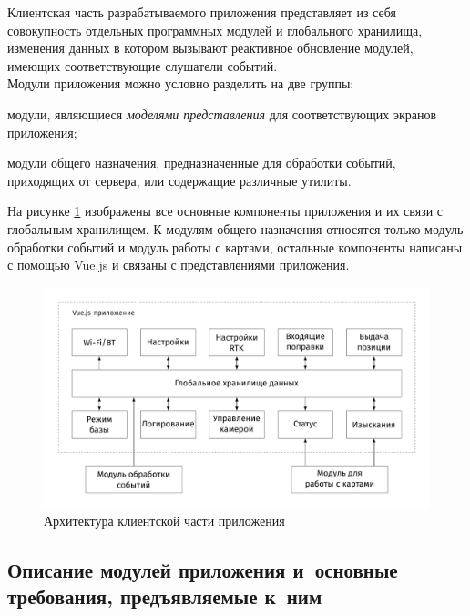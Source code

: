 Клиентская часть разрабатываемого приложения представляет из себя совокупность отдельных программных модулей и глобального хранилища, изменения данных в котором вызывают реактивное обновление модулей, имеющих соответствующие слушатели событий. \\

Модули приложения можно условно разделить на две группы:
\begin{dashitemize}
  \item модули, являющиеся \emph{моделями представления} для соответствующих экранов приложения;
  \item модули общего назначения, предназначенные для обработки событий, приходящих от сервера, или содержащие различные утилиты.
\end{dashitemize}

На рисунке \ref{fig:fe-architecture} изображены все основные компоненты приложения и их связи с глобальным хранилищем. К модулям общего назначения относятся только модуль обработки событий и модуль работы с картами, остальные компоненты написаны с помощью Vue.js и связаны с представлениями приложения.

\begin{figure}[h!]
  \centering
  \setlength{\fboxsep}{5pt}
  \includegraphics[width=\textwidth]{img/tikz/fe-architecture/pic}
  \caption{Архитектура клиентской части приложения}\label{fig:fe-architecture}
\end{figure}


\subsection{Описание модулей приложения и~основные требования, предъявляемые к~ним}
\label{subsec:app-modules-requirements}


